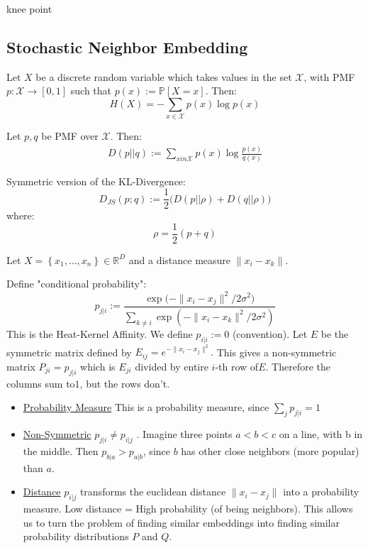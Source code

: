 \documentclass{article}
\begin{document}
\begin{remark} knee point 
\end{remark}

\subsection{Stochastic Neighbor Embedding}
\begin{definition}  Let $X$ be a discrete random variable which takes values in the set $\mathcal{X}$, with PMF $p: \mathcal{X} \to [0,1]$ such that $p(x) := \mathbb{P}[X = x]$. Then:
  \[
    H(X) = - \sum_{x \in \mathcal{X}} p(x) \log p(x)
  \]
  
\end{definition}

\begin{definition}[KL Divergence] Let $p,q$ be PMF over $\mathcal{X}$. Then:
\begin{align*}
  D(p||q) := \sum_{x in \mathcal{X} } p(x) \log \frac{p(x)}{q(x)}
\end{align*}
\end{definition}

\begin{definition} Symmetric version of the KL-Divergence:
\[
  D_{JS}(p ; q) := \frac{1}{2} \big( D(p || \rho) + D(q ||  \rho)  \big)
\]
where:
\[
  \rho = \frac{1}{2} (p+q)
\]
\end{definition}

Let $X = \left\{  x_1, \ldots, x_n \right\} \in \mathbb{R}^{D}$
and a distance measure $\lVert x_i - x_k \rVert$. 

\begin{definition} 
Define "conditional probability":
\[
  p_{j | i } := \frac{\exp{(- \lVert  x_i -x_j \rVert ^2 / 2 \sigma ^2 }) }{\sum_{k \neq  i } \exp (- \lVert x_i-x_k \rVert ^2 / 2 \sigma ^2 )}
\]
This is the Heat-Kernel Affinity. We define $p_{i|i} := 0$ (convention). 
  Let $E$ be the symmetric matrix defined by $E_{ij}=e^{- \lVert x_i -x_j \rVert ^2}.$ This gives a non-symmetric matrix $P_{ji} = p_{j|i}$ which is $E_{ji}$ divided by entire $
  i$-th row of$E$. Therefore the columns sum to$1$, but the rows don't. 

\begin{itemize}
\item \ul{Probability Measure} This is a probability measure, since $\sum_{j} p_{j|i} = 1$
  \item \ul{Non-Symmetric} $p_{j|i} \neq p_{i|j}$ . Imagine three points $a < b < c$ on a line, with b in the middle. Then $p_{b|a} > p_{a | b}$, since $b$ has other close neighbors (more popular) than $a$.  
  \item  \ul{Distance} $p_{i|j}$ transforms the euclidean distance $\lVert x_i - x_j \rVert$ into a probability measure. Low distance = High probability (of being neighbors). This allows us to turn the problem of finding similar embeddings into finding similar probability distributions $P$ and $Q$.
\end{itemize}
\end{definition}
 
\end{document}
